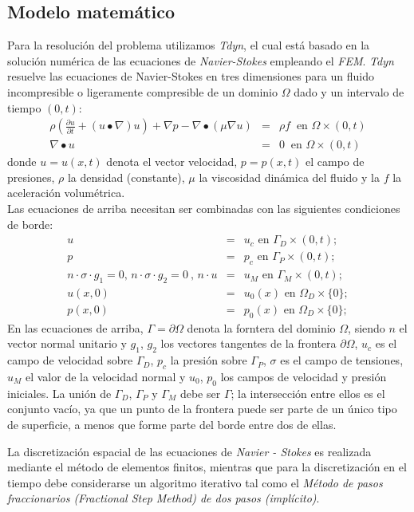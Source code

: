 \documentclass[10pt,a4paper,final]{article}
\begin{document}
\subsection{Modelo matemático}
Para la resolución del problema utilizamos \emph{Tdyn}, el cual está basado en la solución numérica de las ecuaciones de \emph{Navier-Stokes} empleando el \emph{FEM}.
\emph{Tdyn} resuelve las ecuaciones de Navier-Stokes en tres dimensiones para un fluido incompresible o ligeramente compresible de un dominio $\Omega$ dado y un intervalo de tiempo $(0,t):$
\begin{eqnarray}
\rho \left(\frac{\partial u}{\partial t}+\left( u \bullet  \nabla \right)u \right)+ \nabla p - \nabla \bullet(\mu \nabla u) &=& \rho f~ \mbox{ en  }\Omega \times (0,t)\\
\nabla \bullet u&=&0 ~ \mbox{ en  } \Omega \times (0,t)
\end{eqnarray}
donde $u = u(x,t)$ denota el vector velocidad, $p=p(x,t)$ el campo de presiones, $\rho$ la densidad (constante), $\mu$ la viscosidad dinámica del fluido y la $f$ la aceleración volumétrica.\\
Las ecuaciones de arriba necesitan ser combinadas con las siguientes condiciones de borde:
\begin{eqnarray}
u &=& u_c \mbox{ en  } \Gamma_D \times (0,t);\\
p &=& p_c \mbox{ en  } \Gamma_P \times (0,t);\\
n \cdot \sigma \cdot g_1=0 \mbox{, } n \cdot \sigma \cdot g_2=0~ \mbox{, } n \cdot u&=&u_M \mbox{ en  } \Gamma_M \times (0,t);\\
u(x,0)&=&u_0(x) \mbox{ en  } \Omega_D \times \lbrace 0 \rbrace ;\\
p(x,0)&=&p_0(x) \mbox{ en  } \Omega_D \times \lbrace 0 \rbrace ;
\end{eqnarray}
En las ecuaciones de arriba, $\Gamma = \partial \Omega$ denota la forntera del dominio $\Omega$, siendo $n$ el vector normal unitario y $g_1$, $g_2$ los vectores tangentes de la frontera $\partial \Omega$, $u_c$ es el campo de velocidad sobre $\Gamma_D$, $p_c$ la presión sobre $\Gamma_P$, $\sigma$ es el campo de tensiones, $u_M$ el valor de la velocidad normal y $u_0$, $p_0$ los campos de velocidad y presión iniciales. La unión de $\Gamma_D$, $\Gamma_P$ y $\Gamma_M$ debe ser $\Gamma$; la intersección entre ellos es el conjunto vacío, ya que un punto de la frontera puede ser parte de un único tipo de superficie, a menos que forme parte del borde entre dos de ellas.

La discretización espacial de las ecuaciones de \emph{Navier - Stokes} es realizada mediante el método de elementos finitos, mientras que para la discretización en el tiempo debe considerarse un algoritmo iterativo tal como el \emph{Método de pasos fraccionarios (Fractional Step Method) de dos pasos (implícito)}.
\end{document}
